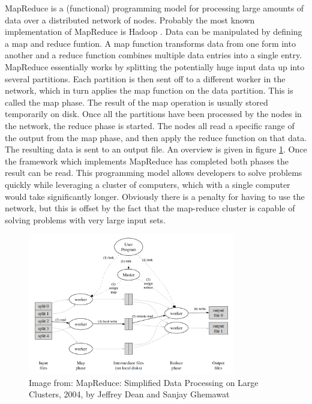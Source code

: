 MapReduce is a (functional) programming model for processing large amounts of
data over a distributed network of nodes. Probably the most known implementation
of MapReduce is Hadoop \cite{Hadoop}. Data can be manipulated by defining a map
and reduce funtion. A map function transforms data from one form into another
and a reduce function combines multiple data entries into a single entry.
MapReduce essentially works by splitting the potentially huge input data up into
several partitions. Each partition is then sent off to a different worker in the
network, which in turn applies the map function on the data partition. This is
called the map phase. The result of the map operation is usually stored
temporarily on disk. Once all the partitions have been processed by the nodes in
the network, the reduce phase is started. The nodes all read a specific range of
the output from the map phase, and then apply the reduce function on that data.
The resulting data is sent to an output file. An overview is given in figure
\ref{fig:mapreduce}. Once the framework which implements MapReduce has completed
both phases the result can be read. This programming model allows developers to
solve problems quickly while leveraging a cluster of computers, which with a
single computer would take significantly longer. Obviously there is a penalty
for having to use the network, but this is offset by the fact that the
map-reduce cluster is capable of solving problems with very large input sets.

\begin{figure}[htb] 
\includegraphics[width=340px]{mapreduce.png} 
\caption{Image from: MapReduce: Simplified Data Processing on Large Clusters, 2004, by Jeffrey Dean and Sanjay Ghemawat} \label{fig:mapreduce} 
\end{figure}
